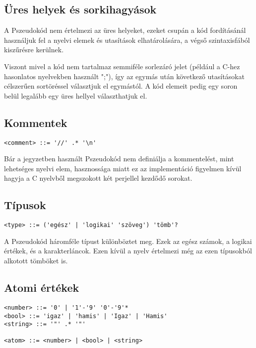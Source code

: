 \subsection{Üres helyek és sorkihagyások}

A Pszeudokód nem értelmezi az üres helyeket, ezeket csupán a kód fordításánál használjuk fel a nyelvi elemek és utasítások elhatárolására, a végső szintaxisfából kiszűrésre kerülnek.

Viszont mivel a kód nem tartalmaz semmiféle sorlezáró jelet (például a C-hez hasonlatos nyelvekben használt ";"), így az egymás után következő utasításokat célszerűen sortöréssel választjuk el egymástól.
A kód elemeit pedig egy soron belül legalább egy üres hellyel választhatjuk el.

\subsection{Kommentek}

\begin{footnotesize}
\begin{verbatim}
<comment> ::= '//' .* '\n'
\end{verbatim}
\end{footnotesize}

Bár a jegyzetben használt Pszeudokód nem definiálja a kommentelést, mint lehetséges nyelvi elem, hasznossága miatt ez az implementáció figyelmen kívül hagyja a C nyelvből megszokott két perjellel kezdődő sorokat.

\subsection{Típusok}

\begin{footnotesize}
\begin{verbatim}
<type> ::= ('egész' | 'logikai' 'szöveg') 'tömb'?
\end{verbatim}
\end{footnotesize}

A Pszeudokód háromféle típust különböztet meg. Ezek az egész számok, a logikai értékek, és a karakterláncok. Ezen kívül a nyelv értelmezi még az ezen típusokból alkotott tömböket is.

\subsection{Atomi értékek}

\begin{footnotesize}
\begin{verbatim}
<number> ::= '0' | '1'-'9' '0'-'9'*
<bool> ::= 'igaz' | 'hamis' | 'Igaz' | 'Hamis'
<string> ::= '"' .* '"'

<atom> ::= <number> | <bool> | <string>
\end{verbatim}
\end{footnotesize}

